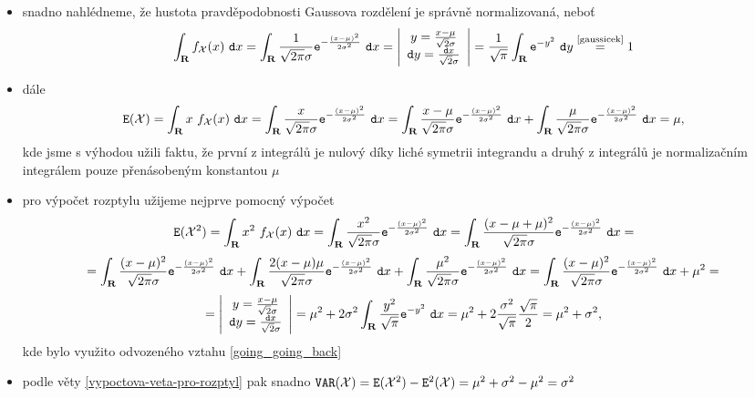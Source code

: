\begin{itemize}
\item snadno nahl\'edneme, \v ze hustota pravd\v epodobnosti Gaussova rozdělení je spr\'avn\v e normalizovan\'a, nebo\v t
%
$$\int_{\mathbf R} f_{\mathcal X}(x)~\mathtt{d}x=\int_{\mathbf R} \frac{1}{\sqrt{2\pi}\sigma}\mathtt{e}^{-\frac{(x-\mu)^2}{2\sigma^2}}~\mathtt{d}x=\left|\begin{array}{c} y=\frac{x-\mu}{\sqrt{2}\sigma}\\ \mathtt{d}y=\frac{\mathtt{d}x}{\sqrt{2}\sigma} \end{array}\right|=\frac{1}{\sqrt{\pi}}\int_{\mathbf R} \mathtt{e}^{-y^2}~\mathtt{d}y \stackrel{\text{\eqref{gaussicek}}}{=}1$$

\item d\'ale $$\mathtt{E}({\mathcal X}) = \int_{\mathbf R} x~f_{\mathcal X}(x)~\mathtt{d}x=\int_{\mathbf R} \frac{x}{\sqrt{2\pi}\sigma}\mathtt{e}^{-\frac{(x-\mu)^2}{2\sigma^2}}~\mathtt{d}x=\int_{\mathbf R} \frac{x-\mu}{\sqrt{2\pi}\sigma}\mathtt{e}^{-\frac{(x-\mu)^2}{2\sigma^2}}~\mathtt{d}x+\int_{\mathbf R} \frac{\mu}{\sqrt{2\pi}\sigma}\mathtt{e}^{-\frac{(x-\mu)^2}{2\sigma^2}}~\mathtt{d}x=\mu,$$
%
kde jsme s v\'yhodou u\v zili faktu, \v ze prvn\'i z integr\'al\r u je nulov\'y d\'iky lich\'e symetrii integrandu a druh\'y z integr\'al\r u je normaliza\v cn\'im integr\'alem pouze p\v ren\'asoben\'ym konstantou $\mu$

\item pro v\'ypo\v cet rozptylu u\v zijeme nejprve pomocn\'y v\'ypo\v cet $$\mathtt{E}({\mathcal X}^2) = \int_{\mathbf R} x^2~f_{\mathcal X}(x)~\mathtt{d}x=\int_{\mathbf R} \frac{x^2}{\sqrt{2\pi}\sigma}\mathtt{e}^{-\frac{(x-\mu)^2}{2\sigma^2}}~\mathtt{d}x=\int_{\mathbf R} \frac{(x-\mu+\mu)^2}{\sqrt{2\pi}\sigma}\mathtt{e}^{-\frac{(x-\mu)^2}{2\sigma^2}}~\mathtt{d}x=$$
%
$$= \int_{\mathbf R} \frac{(x-\mu)^2}{\sqrt{2\pi}\sigma}\mathtt{e}^{-\frac{(x-\mu)^2}{2\sigma^2}}~\mathtt{d}x +  \int_{\mathbf R} \frac{2(x-\mu)\mu}{\sqrt{2\pi}\sigma}\mathtt{e}^{-\frac{(x-\mu)^2}{2\sigma^2}}~\mathtt{d}x +  \int_{\mathbf R}\frac{\mu^2}{\sqrt{2\pi}\sigma}\mathtt{e}^{-\frac{(x-\mu)^2}{2\sigma^2}}~\mathtt{d}x= \int_{\mathbf R}\frac{(x-\mu)^2}{\sqrt{2\pi}\sigma}\mathtt{e}^{-\frac{(x-\mu)^2}{2\sigma^2}}~\mathtt{d}x + \mu^2=$$
%
$$=\left|\begin{array}{c} y=\frac{x-\mu}{\sqrt{2}\sigma}\\ \mathtt{d}y=\frac{\mathtt{d}x}{\sqrt{2}\sigma} \end{array}\right|=\mu^2+ 2\sigma^2\int_{\mathbf R} \frac{y^2}{\sqrt{\pi}}\mathtt{e}^{-y^2}~\mathtt{d}x = \mu^2+2\frac{\sigma^2}{\sqrt{\pi}}\frac{\sqrt{\pi}}{2}=\mu^2+\sigma^2,$$
%
kde bylo vyu\v zito odvozen\'eho vztahu \eqref{going_going_back}

\item podle v\v ety \ref{vypoctova-veta-pro-rozptyl} pak snadno $\mathtt{VAR}({\mathcal X})=\mathtt{E}({\mathcal X}^2)-\mathtt{E}^2({\mathcal X})=\mu^2+\sigma^2-\mu^2=\sigma^2$

\end{itemize}

